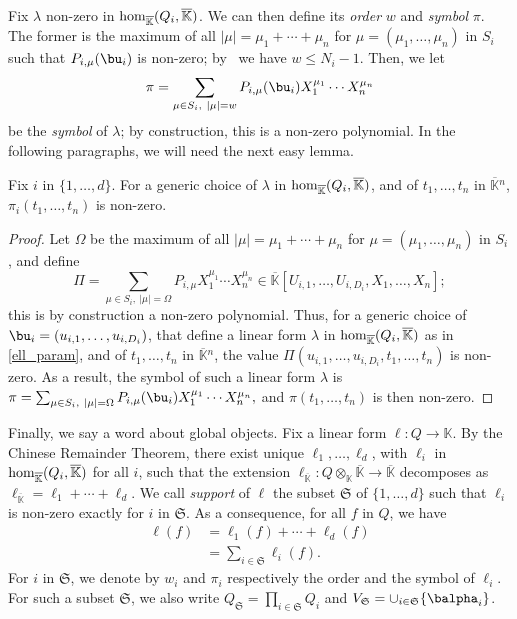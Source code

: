 \documentclass[12pt]{article}
\def\K{\mathbb{K}}
\def\K {\ensuremath{\mathbb{K}}}
\def\Kbar {{\ensuremath{\overline{\mathbb{K}}}}}
\begin{document}
Fix $\lambda$ non-zero in ${\rm hom}_\Kbar(Q_i,\Kbar)$. We can then
define its {\em order} $w$ and {\em symbol} $\pi$. The former is
the maximum of all $|\mu|=\mu_1+\cdots+\mu_n$ for
$\mu=(\mu_1,\dots,\mu_n)$ in $S_i$ such that $P_{i,\mu}(\bu_i)$ is
non-zero; by~\cite[Lemma~3.3]{Mourrain97} we have $w \le
N_i-1$. Then, we let
$$\pi =\sum_{\mu \in S_i,\ |\mu|=w}P_{i,\mu}(\bu_i) X_1^{\mu_1} \cdots
X_n^{\mu_n}$$ be the {\em symbol} of $\lambda$; by construction,
this is a non-zero polynomial. In the following paragraphs, we will
need the next easy lemma.

\begin{lemma}\label{lemma:symbol0}
	Fix $i$ in $\{1,\dots,d\}$. For a generic choice of $\lambda$ in ${\rm
		hom}_\Kbar(Q_i,\Kbar)$, and of $t_1,\dots,t_n$ in $\Kbar{}^n$,
	$\pi_i(t_1,\dots,t_n)$ is non-zero.
\end{lemma}
\begin{proof}
	Let $\Omega$ be the maximum of all $|\mu|=\mu_1+\cdots+\mu_n$ for
	$\mu=(\mu_1,\dots,\mu_n)$ in $S_i$, and define 
	$$\Pi =\sum_{\mu \in S_i,\ |\mu|=\Omega}P_{i,\mu} X_1^{\mu_1} \cdots
	X_n^{\mu_n} \in \Kbar[U_{i,1},\dots,U_{i,D_i},X_1,\dots,X_n];$$ this
	is by construction a non-zero polynomial.  Thus, for a generic
	choice of $\bu_i=(u_{i,1},\dots,u_{i,D_i})$, that define a linear form
	$\lambda$ in ${\rm hom}_\Kbar(Q_i,\Kbar)$ as in \cref{ell_param},
	and of $t_1,\dots,t_n$ in $\Kbar{}^n$, the value
	$\Pi(u_{i,1},\dots,u_{i,D_i},t_1,\dots,t_n)$ is non-zero. As a
	result, the symbol of such a linear form $\lambda$ is $\pi =\sum_{\mu \in
		S_i,\ |\mu|=\Omega}P_{i,\mu}(\bu_i) X_1^{\mu_1} \cdots X_n^{\mu_n},$
	and $\pi(t_1,\dots,t_n)$ is then non-zero.
\end{proof}



Finally, we say a word about global objects.  Fix a linear form $\ell:
Q \to \K$. By the Chinese Remainder Theorem, there exist unique
$\ell_1,\dots,\ell_d$, with $\ell_i$ in ${\rm hom}_\Kbar(Q_i,\Kbar)$
for all $i$, such that the extension $\ell_\Kbar: Q\otimes_\K \Kbar
\to \Kbar$ decomposes as $\ell_\Kbar = \ell_1 + \cdots + \ell_d$. We
call {\em support} of $\ell$ the subset $\mathfrak{S}$ of
$\{1,\dots,d\}$ such that $\ell_i$ is non-zero exactly for $i$ in
$\mathfrak{S}$.  As a consequence, for all $f$ in $Q$, we have
\begin{align}\label{eq:fui}
\ell(f) &= \ell_1(f) + \cdots + \ell_d(f)\nonumber\\
&=  \sum_{i \in \mathfrak{S}} \ell_i(f).
\end{align}
For $i$ in $\mathfrak{S}$, we denote by $w_i$ and $\pi_i$ respectively
the order and the symbol of $\ell_i$. For such a subset
$\mathfrak{S}$, we also write $Q_\mathfrak{S}=\prod_{i \in
	\mathfrak{S}} Q_i$ and $V_\mathfrak{S}=\cup_{i \in \mathfrak{S}}
\{\balpha_i\}$.
\end{document}
